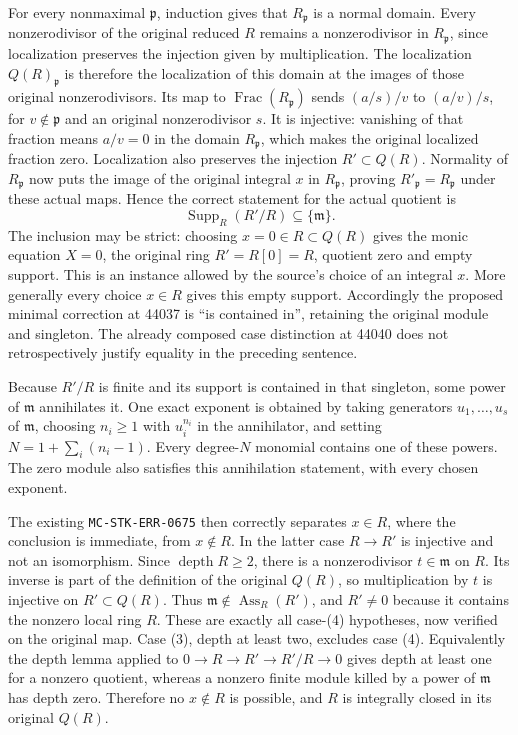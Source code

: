 For every nonmaximal \(\mathfrak p\), induction gives that \(R_{\mathfrak p}\) is a normal domain. Every nonzerodivisor of the original reduced \(R\) remains a nonzerodivisor in \(R_{\mathfrak p}\), since localization preserves the injection given by multiplication. The localization \(Q(R)_{\mathfrak p}\) is therefore the localization of this domain at the images of those original nonzerodivisors. Its map to \(\operatorname{Frac}(R_{\mathfrak p})\) sends \((a/s)/v\) to \((a/v)/s\), for \(v\notin\mathfrak p\) and an original nonzerodivisor \(s\). It is injective: vanishing of that fraction means \(a/v=0\) in the domain \(R_{\mathfrak p}\), which makes the original localized fraction zero. Localization also preserves the injection \(R'\subset Q(R)\). Normality of \(R_{\mathfrak p}\) now puts the image of the original integral \(x\) in \(R_{\mathfrak p}\), proving \(R'_{\mathfrak p}=R_{\mathfrak p}\) under these actual maps. Hence the correct statement for the actual quotient is \[
 \operatorname{Supp}_R(R'/R)\subseteq\{\mathfrak m\}.
\] The inclusion may be strict: choosing \(x=0\in R\subset Q(R)\) gives the monic equation \(X=0\), the original ring \(R'=R[0]=R\), quotient zero and empty support. This is an instance allowed by the source's choice of an integral \(x\). More generally every choice \(x\in R\) gives this empty support. Accordingly the proposed minimal correction at 44037 is ``is contained in'', retaining the original module and singleton. The already composed case distinction at 44040 does not retrospectively justify equality in the preceding sentence.

Because \(R'/R\) is finite and its support is contained in that singleton, some power of \(\mathfrak m\) annihilates it. One exact exponent is obtained by taking generators \(u_1,\ldots,u_s\) of \(\mathfrak m\), choosing \(n_i\geq1\) with \(u_i^{n_i}\) in the annihilator, and setting \(N=1+\sum_i(n_i-1)\). Every degree-\(N\) monomial contains one of these powers. The zero module also satisfies this annihilation statement, with every chosen exponent.

The existing \texttt{MC-\AlgebraIdentifierBreak{}STK-\AlgebraIdentifierBreak{}ERR-\AlgebraIdentifierBreak{}0675} then correctly separates \(x\in R\), where the conclusion is immediate, from \(x\notin R\). In the latter case \(R\to R'\) is injective and not an isomorphism. Since \(\operatorname{depth}R\geq2\), there is a nonzerodivisor \(t\in\mathfrak m\) on \(R\). Its inverse is part of the definition of the original \(Q(R)\), so multiplication by \(t\) is injective on \(R'\subset Q(R)\). Thus \(\mathfrak m\notin\operatorname{Ass}_R(R')\), and \(R'\ne0\) because it contains the nonzero local ring \(R\). These are exactly all case-(4) hypotheses, now verified on the original map. Case (3), depth at least two, excludes case (4). Equivalently the depth lemma applied to \(0\to R\to R'\to R'/R\to0\) gives depth at least one for a nonzero quotient, whereas a nonzero finite module killed by a power of \(\mathfrak m\) has depth zero. Therefore no \(x\notin R\) is possible, and \(R\) is integrally closed in its original \(Q(R)\).

